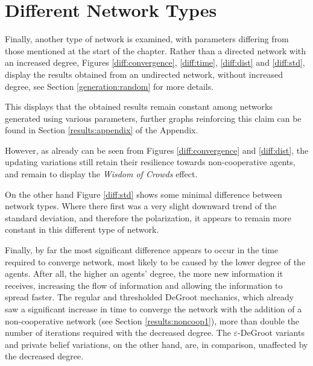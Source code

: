 \documentclass[a4paper, 12pt]{report}
\begin{document}
\newpage

\section{Different Network Types}

Finally, another type of network is examined, with parameters differing from those mentioned at the start of the chapter. Rather than a directed network with an increased degree, Figures \ref{diff:convergence}, \ref{diff:time}, \ref{diff:dist} and \ref{diff:std}, display the results obtained from an undirected network, without increased degree, see Section \ref{generation:random} for more details.

\noindent This displays that the obtained results remain constant among networks generated using various parameters, further graphs reinforcing this claim can be found in Section \ref{results:appendix} of the Appendix.

\noindent However, as already can be seen from Figures \ref{diff:convergence} and \ref{diff:dist}, the updating variations still retain their resilience towards non-cooperative agents, and remain to display the \emph{Wisdom of Crowds} effect.

\noindent On the other hand Figure \ref{diff:std} shows some minimal difference between network types. Where there first was a very slight downward trend of the standard deviation, and therefore the polarization, it appears to remain more constant in this different type of network.

\noindent Finally, by far the most significant difference appears to occur in the time required to converge network, most likely to be caused by the lower degree of the agents. After all, the higher an agents' degree, the more new information it receives, increasing the flow of information and allowing the information to spread faster. The regular and thresholded DeGroot mechanics, which already saw a significant increase in time to converge the network with the addition of a non-cooperative network (see Section \ref{results:noncoop1}), more than double the number of iterations required with the decreased degree. The $\varepsilon$-DeGroot variants and private belief variations, on the other hand,  are, in comparison, unaffected by the decreased degree.

\newpage
\end{document}
